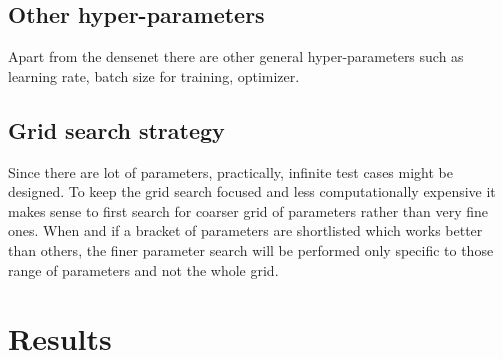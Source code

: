 \subsection{Other hyper-parameters}
Apart from the densenet there are other general hyper-parameters such as learning rate, batch size for training, optimizer. 


\subsection{Grid search strategy}
Since there are lot of parameters, practically, infinite test cases might be designed. To keep the grid search focused and less computationally expensive it makes sense to 
first search for coarser grid of parameters rather than very fine ones. When and if a bracket of parameters are shortlisted which works better than others, the finer parameter
search will be performed only specific to those range of parameters and not the whole grid.

\section{Results} 

